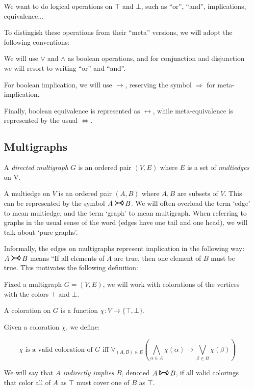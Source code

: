 \documentclass[11pt]{article}
\newcommand{\rightcurvearrow}{
\mathrel{
  \begin{tikzpicture}[scale=0.8]
    \draw[thick,->] (0,1ex) arc (30:150:-2ex);
    \draw[thick,->] (0,-1ex) arc (150:30:2ex);
  \end{tikzpicture}
}
}
\newcommand{\Rightcurvearrow}{
\mathrel{
  \begin{tikzpicture}[scale=0.8]
    \draw[thick,->] (0,1ex) arc (30:150:-2ex);
    \draw[thick,->] (0,-1ex) arc (150:30:2ex);
    \draw[thick] (0, 1ex) -- (0, -1ex);
  \end{tikzpicture}
}
}
\begin{document}
We want to do logical operations on $\top$ and $\bot$, such as ``or'', ``and'', implications, equivalence...

To distingish these operations from their ``meta'' versions, we will adopt the following conventions:

We will use $\vee$ and $\wedge$ as boolean operations, and for conjunction and disjunction we will resort to writing ``or'' and ``and''.

For boolean implication, we will use $\rightarrow$, reserving the symbol $\Rightarrow$ for meta-implication.

Finally, boolean equivalence is represented as $\leftrightarrow$, while meta-equivalence is represented by the usual $\Leftrightarrow$.


\subsection{Multigraphs}

A \emph{directed multigraph} $G$ is an ordered pair $(V, E)$ where $E$ is a set of \emph{multiedges} on V.

A multiedge on $V$ is an ordered pair $(A, B)$ where $A, B$ are subsets of $V$. This can be represented by the symbol $A \rightcurvearrow B$. We will often overload the term `edge' to mean multiedge, and the term `graph' to mean multigraph. When referring to graphs in the usual sense of the word (edges have one tail and one head), we will talk about `pure graphs'.

Informally, the edges on multigraphs represent implication in the following way: $A \rightcurvearrow B$ means ``If all elements of $A$ are true, then one element of $B$ must be true. This motivates the following definition:

Fixed a multigraph $G = (V,E)$, we will work with colorations of the vertices with the colors $\top$ and $\bot$.

A coloration on $G$ is a function $\chi : V \rightarrow \{\top, \bot\}$.

Given a coloration $\chi$, we define:

\[ \chi \text{ is a valid coloration of $G$ iff } \forall_{(A,B) \in E} \left( \bigwedge_{\alpha \in A} \chi(\alpha) \rightarrow \bigvee_{\beta \in B} \chi(\beta) \right)\]

We will say that \emph{$A$ indirectly implies $B$}, denoted $A \Rightcurvearrow B$, if all valid colorings that color all of $A$ as $\top$ must cover one of $B$ as $\top$.
\end{document}
